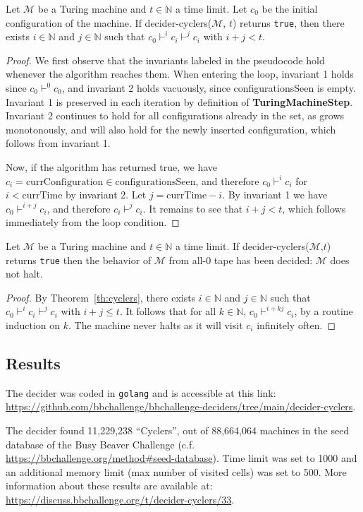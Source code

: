 \begin{theorem}\label{th:cyclers}\normalfont Let $\mathcal{M}$ be a Turing machine and $t \in \mathbb{N}$ a time limit. Let $c_0$ be the initial configuration of the machine. If {\sc decider-cyclers}($\mathcal{M}$, $t$) returns \texttt{true}, then there exists $i\in\mathbb{N}$ and $j\in\mathbb{N}$ such that $c_0 \vdash^i c_i \vdash^j c_i$ with $i+j < t$.
\end{theorem}
\begin{proof}
  We first observe that the invariants labeled in the pseudocode hold whenever
  the algorithm reaches them. When entering the loop, invariant 1 holds since
  $c_0 \vdash^0 c_0$, and invariant 2 holds vacuously, since configurationsSeen
  is empty. Invariant 1 is preserved in each iteration by definition of
  \textbf{TuringMachineStep}. Invariant 2 continues to hold for all configurations
  already in the set, as  grows monotonously, and will also hold
  for the newly inserted configuration, which follows from invariant 1.

  Now, if the algorithm has returned true, we have
  $c_i = \text{currConfiguration} \in \text{configurationsSeen}$, and therefore
  $c_0 \vdash^i c_i$ for $i < \text{currTime}$ by invariant 2.
  Let $j = \text{currTime} - i$. By invariant 1 we have $c_0 \vdash^{i + j} c_i$,
  and therefore $c_i \vdash^j c_i$. It remains to see that $i + j < t$, which
  follows immediately from the loop condition.
\end{proof}

\begin{corollary}\normalfont
  Let $\mathcal{M}$ be a Turing machine and $t \in \mathbb{N}$ a time limit. If {\sc decider-cyclers}($\mathcal{M}$,$t$) returns \texttt{true} then the behavior of $\mathcal{M}$ from all-0 tape has been decided: $\mathcal{M}$ does not halt.
\end{corollary}
\begin{proof}
  By Theorem~\ref{th:cyclers}, there exists $i\in\mathbb{N}$ and $j\in\mathbb{N}$ such that $c_0 \vdash^i c_i \vdash^j c_i$ with $i+j \leq t$. It follows that for all $k\in\mathbb{N}$, $c_0 \vdash^{i+kj} c_i$, by a routine induction on $k$. The machine never halts as it will visit $c_i$ infinitely often.
\end{proof}

\subsection{Results}

The decider was coded in \texttt{golang} and is accessible at this link: \url{https://github.com/bbchallenge/bbchallenge-deciders/tree/main/decider-cyclers}.

The decider found 11,229,238 ``Cyclers'', out of 88,664,064 machines in the seed database of the Busy Beaver Challenge (c.f. \url{https://bbchallenge.org/method#seed-database}). Time limit was set to 1000 and an additional memory limit (max number of visited cells) was set to 500. More information about these results are available at: \url{https://discuss.bbchallenge.org/t/decider-cyclers/33}.
